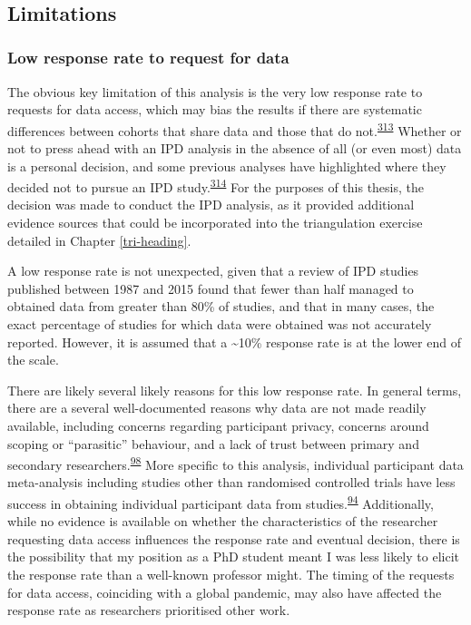\documentclass[a4paper, twoside]{templates/ociamthesis}
\begin{document}
~

\hypertarget{limitations-1}{%
\subsection{Limitations}\label{limitations-1}}

\hypertarget{low-response-rate-to-request-for-data}{%
\subsubsection{Low response rate to request for data}\label{low-response-rate-to-request-for-data}}

The obvious key limitation of this analysis is the very low response rate to requests for data access, which may bias the results if there are systematic differences between cohorts that share data and those that do not.\textsuperscript{\protect\hyperlink{ref-ahmed2012}{313}} Whether or not to press ahead with an IPD analysis in the absence of all (or even most) data is a personal decision, and some previous analyses have highlighted where they decided not to pursue an IPD study.\textsuperscript{\protect\hyperlink{ref-jaspers2014}{314}} For the purposes of this thesis, the decision was made to conduct the IPD analysis, as it provided additional evidence sources that could be incorporated into the triangulation exercise detailed in Chapter \ref{tri-heading}.

A low response rate is not unexpected, given that a review of IPD studies published between 1987 and 2015 found that fewer than half managed to obtained data from greater than 80\% of studies, and that in many cases, the exact percentage of studies for which data were obtained was not accurately reported. However, it is assumed that a \textasciitilde10\% response rate is at the lower end of the scale.

There are likely several likely reasons for this low response rate. In general terms, there are a several well-documented reasons why data are not made readily available, including concerns regarding participant privacy, concerns around scoping or ``parasitic'' behaviour, and a lack of trust between primary and secondary researchers.\textsuperscript{\protect\hyperlink{ref-vanpanhuis2014}{98}} More specific to this analysis, individual participant data meta-analysis including studies other than randomised controlled trials have less success in obtaining individual participant data from studies.\textsuperscript{\protect\hyperlink{ref-nevitt2017a}{94}} Additionally, while no evidence is available on whether the characteristics of the researcher requesting data access influences the response rate and eventual decision, there is the possibility that my position as a PhD student meant I was less likely to elicit the response rate than a well-known professor might. The timing of the requests for data access, coinciding with a global pandemic, may also have affected the response rate as researchers prioritised other work.
\end{document}
